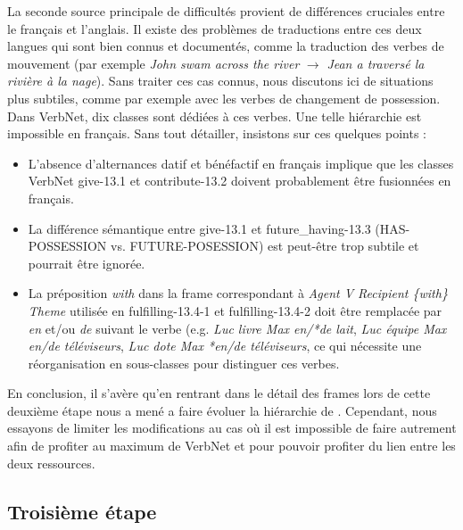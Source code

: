 La seconde source principale de difficultés provient de différences cruciales
entre le français et l'anglais. Il existe des problèmes de traductions entre
ces deux langues qui sont bien connus et documentés, comme la traduction des
verbes de mouvement (par exemple \emph{John swam across the river}
$\rightarrow$ \emph{Jean a traversé la rivière à la nage}). Sans traiter ces
cas connus, nous discutons ici de situations plus subtiles, comme par exemple
avec les verbes de changement de possession. Dans VerbNet, dix classes sont
dédiées à ces verbes. Une telle hiérarchie est impossible en français. Sans
tout détailler, insistons sur ces quelques points :

\begin{itemize}

    \item L'absence d'alternances datif et bénéfactif en français implique que
        les classes VerbNet {\color{blue}give-13.1} et
        {\color{blue}contribute-13.2} doivent probablement être fusionnées en
        français.

    \item La différence sémantique entre {\color{blue}give-13.1} et
        {\color{blue}future\_having-13.3} (HAS-POSSESSION vs. FUTURE-POSESSION)
        est peut-être trop subtile et pourrait être ignorée.

    \item La préposition \emph{with} dans la frame correspondant à \emph{Agent
        V Recipient \{with\} Theme} utilisée en {\color{blue}fulfilling-13.4-1}
        et {\color{blue}fulfilling-13.4-2} doit être remplacée par \emph{en}
        et/ou \emph{de} suivant le verbe (e.g. \emph{Luc livre Max en/*de
        lait}, \emph{Luc équipe Max en/de téléviseurs}, \emph{Luc dote Max
        *en/de téléviseurs}, ce qui nécessite une réorganisation en
        sous-classes pour distinguer ces verbes.

\end{itemize}

En conclusion, il s'avère qu'en rentrant dans le détail des frames lors de
cette deuxième étape nous a mené a faire évoluer la hiérarchie de \verbenet{}.
Cependant, nous essayons de limiter les modifications au cas où il est
impossible de faire autrement afin de profiter au maximum de VerbNet et pour
pouvoir profiter du lien entre les deux ressources.

\subsection{Troisième étape}
\label{third}

